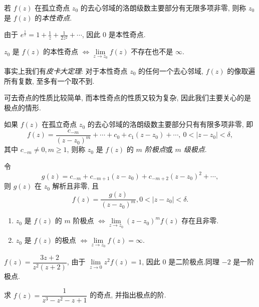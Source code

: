 \begin{definition}
	若 $f(z)$ 在孤立奇点 $z_0$ 的去心邻域的洛朗级数主要部分有无限多项非零, 则称 $z_0$ 是 $f(z)$ 的\emph{本性奇点}.
\end{definition}

\begin{example}
	由于 $\displaystyle e^{\frac1z}=1+\frac1z+\frac1{2z^2}+\cdots$, 因此 $0$ 是本性奇点.
\end{example}

\begin{theorem}
	$z_0$ 是 $f(z)$ 的本性奇点 $\iff\lim\limits_{z\to z_0}f(z)$ 不存在也不是 $\infty$.
\end{theorem}

事实上我们有\emph{皮卡大定理}: 对于本性奇点 $z_0$ 的任何一个去心邻域, $f(z)$ 的像取遍所有复数, 至多有一个取不到.

可去奇点的性质比较简单, 而本性奇点的性质又较为复杂, 因此我们主要关心的是极点的情形.

\begin{definition}
	如果 $f(z)$ 在孤立奇点 $z_0$ 的去心邻域的洛朗级数主要部分只有有限多项非零, 即
	\[f(z)=\frac{c_{-m}}{(z-z_0)^m}+\cdots+c_0+c_1(z-z_0)+\cdots,\ 0<|z-z_0|<\delta,\]
	其中 $c_{-m}\neq 0,m\ge 1$, 则称 $z_0$ 是 $f(z)$ 的 \emph{$m$ 阶极点}或 \emph{$m$ 级极点}.
\end{definition}

令
\[g(z)=c_{-m}+c_{-m+1}(z-z_0)+c_{-m+2}(z-z_0)^2+\cdots,\]
则 $g(z)$ 在 $z_0$ 解析且非零,
且
\[f(z)=\dfrac{g(z)}{(z-z_0)^m},0<|z-z_0|<\delta.\]

\begin{theorem}
	\begin{enumerate}
		\item $z_0$ 是 $f(z)$ 的 $m$ 阶极点 $\iff\lim\limits_{z\to z_0}(z-z_0)^mf(z)$ 存在且非零.
		\item $z_0$ 是 $f(z)$ 的极点 $\iff\lim\limits_{z\to z_0}f(z)=\infty$.
	\end{enumerate}
\end{theorem}

\begin{example}
		$f(z)=\dfrac{3z+2}{z^2(z+2)}$,
	{由于 $\lim\limits_{z\to 0}z^2f(z)=1$, 因此 $0$ 是二阶极点.同理 $-2$ 是一阶极点.
	}
\end{example}

\begin{exercise}
	求 $f(z)=\dfrac1{z^3-z^2-z+1}$ 的奇点, 并指出极点的阶.
\end{exercise}

